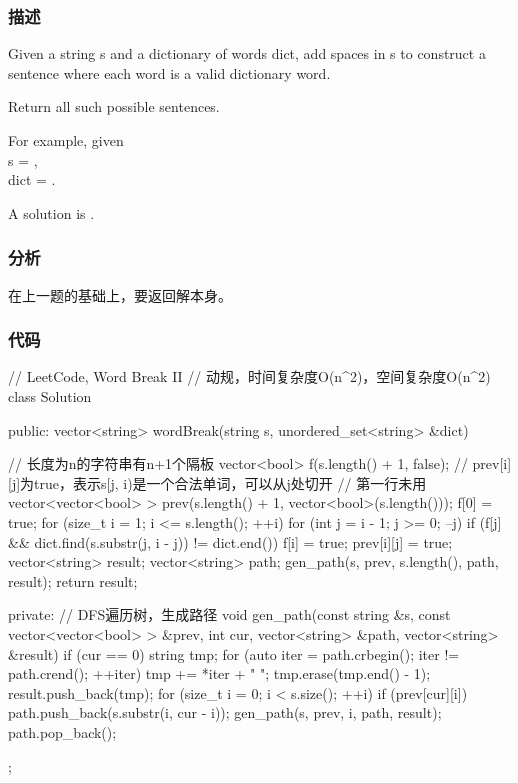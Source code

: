 \subsubsection{描述}
Given a string s and a dictionary of words dict, add spaces in s to construct a sentence where each word is a valid dictionary word.

Return all such possible sentences.

For example, given  \\
s = , \\
dict = .

A solution is .


\subsubsection{分析}
在上一题的基础上，要返回解本身。


\subsubsection{代码}
\begin{Code}
// LeetCode, Word Break II
// 动规，时间复杂度O(n^2)，空间复杂度O(n^2)
class Solution {
public:
    vector<string> wordBreak(string s, unordered_set<string> &dict) {
        // 长度为n的字符串有n+1个隔板
        vector<bool> f(s.length() + 1, false);
        // prev[i][j]为true，表示s[j, i)是一个合法单词，可以从j处切开
        // 第一行未用
        vector<vector<bool> > prev(s.length() + 1, vector<bool>(s.length()));
        f[0] = true;
        for (size_t i = 1; i <= s.length(); ++i) {
            for (int j = i - 1; j >= 0; --j) {
                if (f[j] && dict.find(s.substr(j, i - j)) != dict.end()) {
                    f[i] = true;
                    prev[i][j] = true;
                }
            }
        }
        vector<string> result;
        vector<string> path;
        gen_path(s, prev, s.length(), path, result);
        return result;

    }
private:
    // DFS遍历树，生成路径
    void gen_path(const string &s, const vector<vector<bool> > &prev,
            int cur, vector<string> &path, vector<string> &result) {
        if (cur == 0) {
            string tmp;
            for (auto iter = path.crbegin(); iter != path.crend(); ++iter)
                tmp += *iter + " ";
            tmp.erase(tmp.end() - 1);
            result.push_back(tmp);
        }
        for (size_t i = 0; i < s.size(); ++i) {
            if (prev[cur][i]) {
                path.push_back(s.substr(i, cur - i));
                gen_path(s, prev, i, path, result);
                path.pop_back();
            }
        }
    }
};
\end{Code}


